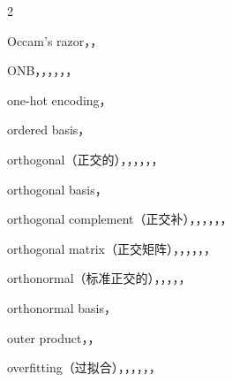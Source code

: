 \begin{multicols}{2}
\medskip{}\par\smallskip
\noindent Occam’s razor，，\par
\noindent ONB，，，，，，\par
\noindent one-hot encoding，\par
\noindent ordered basis，\par
\noindent orthogonal（正交的），，，，，，\par
\noindent orthogonal basis，\par
\noindent orthogonal complement（正交补），，，，，，\par
\noindent orthogonal matrix（正交矩阵），，，，，，\par
\noindent orthonormal（标准正交的），，，，，\par
\noindent orthonormal basis，\par
\noindent outer product，，\par
\noindent overfitting（过拟合），，，，，，\par


\end{multicols}
